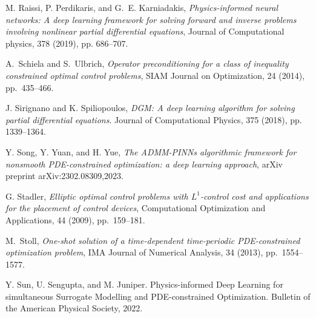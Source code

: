 \documentclass[final]{siamart171218}
\theoremstyle{remark}
\begin{document}
\begin{thebibliography}{10}
{ M. Raissi, P. Perdikaris, and G.~E. Karniadakis,}
{\em Physics-informed neural networks: A deep learning framework for
	solving forward and inverse problems involving nonlinear partial differential
	equations}, Journal of Computational physics, 378 (2019), pp. 686--707.


	
	
	{ A.~Schiela and S.~Ulbrich}, {\em Operator preconditioning for a class of
		inequality constrained optimal control problems}, SIAM Journal on
	Optimization, 24 (2014), pp.~435--466.
	
	J. Sirignano and K. Spiliopoulos,  {\em DGM: A deep learning algorithm for solving partial differential equations}. Journal of Computational Physics, 375 (2018), pp. 1339--1364.
	
%	
	Y. Song, Y. Yuan, and H. Yue, {\em The ADMM-PINNs algorithmic framework for nonsmooth PDE-constrained optimization: a deep learning approach}, arXiv preprint arXiv:2302.08309,2023.

	
	{G. Stadler},
	{\em Elliptic optimal control problems with ${L}^1$-control cost and
	applications for the placement of control devices},
	Computational Optimization and Applications, 44 (2009), pp.~159--181.
	
	{ M.~Stoll}, {\em One-shot solution of a time-dependent time-periodic
		PDE-constrained optimization problem}, IMA Journal of Numerical Analysis, 34
	(2013), pp.~1554--1577.
	
	Y. Sun, U. Sengupta, and M. Juniper. Physics-informed Deep Learning for simultaneous Surrogate Modelling and PDE-constrained Optimization. Bulletin of the American Physical Society, 2022.
%	
	

\end{thebibliography}
\end{document}
